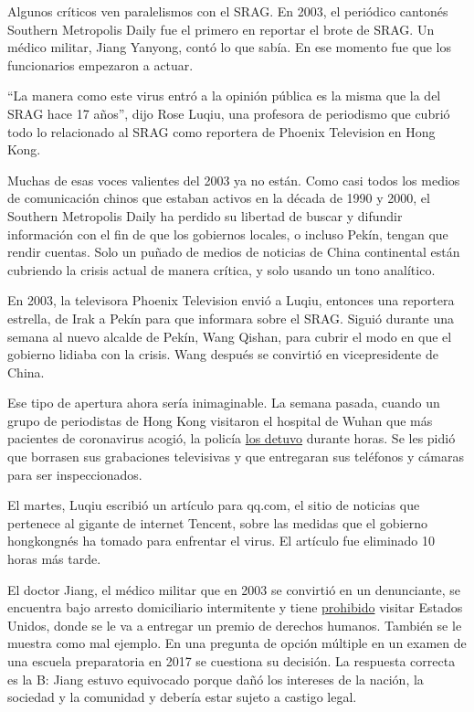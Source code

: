 Algunos críticos ven paralelismos con el SRAG. En 2003, el periódico
cantonés Southern Metropolis Daily fue el primero en reportar el brote
de SRAG. Un médico militar, Jiang Yanyong, contó lo que sabía. En ese
momento fue que los funcionarios empezaron a actuar.

``La manera como este virus entró a la opinión pública es la misma que
la del SRAG hace 17 años'', dijo Rose Luqiu, una profesora de periodismo
que cubrió todo lo relacionado al SRAG como reportera de Phoenix
Television en Hong Kong.

Muchas de esas voces valientes del 2003 ya no están. Como casi todos los
medios de comunicación chinos que estaban activos en la década de 1990 y
2000, el Southern Metropolis Daily ha perdido su libertad de buscar y
difundir información con el fin de que los gobiernos locales, o incluso
Pekín, tengan que rendir cuentas. Solo un puñado de medios de noticias
de China continental están cubriendo la crisis actual de manera crítica,
y solo usando un tono analítico.

En 2003, la televisora Phoenix Television envió a Luqiu, entonces una
reportera estrella, de Irak a Pekín para que informara sobre el SRAG.
Siguió durante una semana al nuevo alcalde de Pekín, Wang Qishan, para
cubrir el modo en que el gobierno lidiaba con la crisis. Wang después se
convirtió en vicepresidente de China.

Ese tipo de apertura ahora sería inimaginable. La semana pasada, cuando
un grupo de periodistas de Hong Kong visitaron el hospital de Wuhan que
más pacientes de coronavirus acogió, la policía
\href{http://news.tvb.com/local/5e1d7dc434b0315b57158f6a/\%E6\%9C\%AC\%E6\%B8\%AF\%E5\%A4\%9A\%E5\%90\%8D\%E8\%A8\%98\%E8\%80\%85\%E6\%AD\%A6\%E6\%BC\%A2\%E9\%86\%AB\%E9\%99\%A2\%E6\%8E\%A1\%E8\%A8\%AA\%E6\%99\%82\%E8\%A2\%AB\%E6\%89\%A3\%E6\%9F\%A5-\%E8\%A6\%81\%E6\%B1\%82\%E5\%88\%AA\%E9\%99\%A4\%E6\%8B\%8D\%E6\%94\%9D\%E7\%B4\%A0\%E6\%9D\%90}{los
detuvo} durante horas. Se les pidió que borrasen sus grabaciones
televisivas y que entregaran sus teléfonos y cámaras para ser
inspeccionados.

El martes, Luqiu escribió un artículo para qq.com, el sitio de noticias
que pertenece al gigante de internet Tencent, sobre las medidas que el
gobierno hongkongnés ha tomado para enfrentar el virus. El artículo fue
eliminado 10 horas más tarde.

El doctor Jiang, el médico militar que en 2003 se convirtió en un
denunciante, se encuentra bajo arresto domiciliario intermitente y tiene
\href{https://www.nytimes.com/2007/07/13/world/asia/13doctor.html}{prohibido}
visitar Estados Unidos, donde se le va a entregar un premio de derechos
humanos. También se le muestra como mal ejemplo. En una pregunta de
opción múltiple en un examen de una escuela preparatoria en 2017 se
cuestiona su decisión. La respuesta correcta es la B: Jiang estuvo
equivocado porque dañó los intereses de la nación, la sociedad y la
comunidad y debería estar sujeto a castigo legal.

